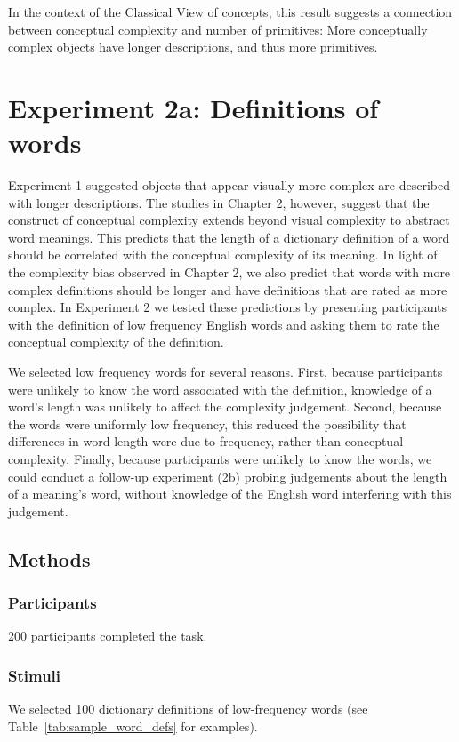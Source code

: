 In the context of the Classical View of concepts, this result suggests a connection between conceptual complexity and number of primitives: More conceptually complex objects have longer descriptions, and thus more primitives. 

\section{Experiment 2a: Definitions of words}
Experiment 1 suggested objects that appear visually more complex are described with longer descriptions. The studies in Chapter 2, however, suggest that the construct of conceptual complexity extends beyond visual complexity to abstract word meanings. This predicts that the length of a dictionary definition of a word should be correlated with the conceptual complexity of its meaning. In light of the complexity bias observed in Chapter 2, we also predict that words with more complex definitions should be longer and have definitions that are rated as more complex. In Experiment 2 we tested these predictions by presenting participants with the definition of low frequency English words  and asking them to rate the conceptual complexity of the definition.

We selected low frequency words for several reasons. First, because participants were unlikely to know the word associated with the definition, knowledge of a word's length was unlikely to affect the complexity judgement. Second, because the words were uniformly low frequency, this reduced the possibility that differences in word length were due to frequency, rather than conceptual complexity. Finally, because participants were unlikely to know the words, we could conduct a follow-up experiment (2b) probing judgements about the length of a meaning's word, without knowledge of the English word interfering with this judgement.

\subsection{Methods}

\subsubsection{Participants} 
200 participants completed the task.

\subsubsection{Stimuli} 
We selected 100 dictionary definitions of low-frequency words (see Table~\ref{tab:sample_word_defs} for examples). 

